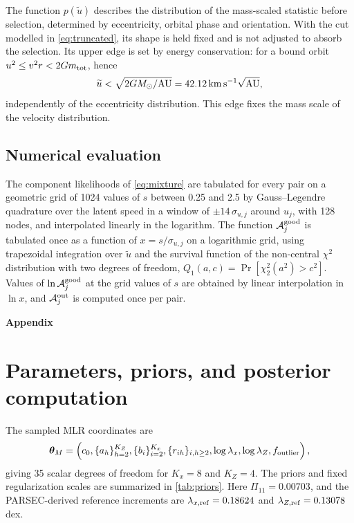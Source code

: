 The function $p(\widetilde u)$ describes the distribution of the mass-scaled statistic before selection, determined by eccentricity, orbital phase and orientation. With the cut modelled in \cref{eq:truncated}, its shape is held fixed and is not adjusted to absorb the selection. Its upper edge is set by energy conservation: for a bound orbit $u^2\le v^2r<2Gm_{\rm tot}$, hence
\begin{equation}
 \widetilde u<\sqrt{2GM_{\odot}/\mathrm{AU}}=42.12\,\mathrm{km}\,\mathrm{s}^{-1}\sqrt{\mathrm{AU}} ,
\end{equation}
independently of the eccentricity distribution. This edge fixes the mass scale of the velocity distribution.

\subsection{Numerical evaluation}

The component likelihoods of \cref{eq:mixture} are tabulated for every pair on a geometric grid of 1024 values of $s$ between 0.25 and 2.5 by Gauss--Legendre quadrature over the latent speed in a window of $\pm14\,\sigma_{u,j}$ around $u_j$, with 128 nodes, and interpolated linearly in the logarithm. The function $\mathcal A^{\rm good}_j$ is tabulated once as a function of $x=s/\sigma_{u,j}$ on a logarithmic grid, using trapezoidal integration over $\widetilde u$ and the survival function of the non-central $\chi^2$ distribution with two degrees of freedom, $Q_1(a,c)=\Pr[\chi^2_2(a^2)>c^2]$. Values of $\ln\mathcal A^{\rm good}_j$ at the grid values of $s$ are obtained by linear interpolation in $\ln x$, and $\mathcal A^{\rm out}_j$ is computed once per pair.

\clearpage
\begin{center}
  {\Huge\bfseries Appendix}
\end{center}
\vspace{1.5em}
\appendix

\section{Parameters, priors, and posterior computation}
\label{sec:inference}

The sampled MLR coordinates are
\begin{equation}
 \bm\theta_M=\left(c_0,\{a_h\}_{h=2}^{K_Z},
 \{b_i\}_{i=2}^{K_x},\{r_{ih}\}_{i,h\ge2},
 \log\lambda_x,\log\lambda_Z,f_{\rm outlier}\right),
\end{equation}
giving 35 scalar degrees of freedom for $K_x=8$ and $K_Z=4$.  The priors and
fixed regularization scales are summarized in \cref{tab:priors}.  Here
$\Pi_{11}=0.00703$, and the PARSEC-derived reference increments are
$\lambda_{x,\rm ref}=0.18624$ and $\lambda_{Z,\rm ref}=0.13078$ dex.

